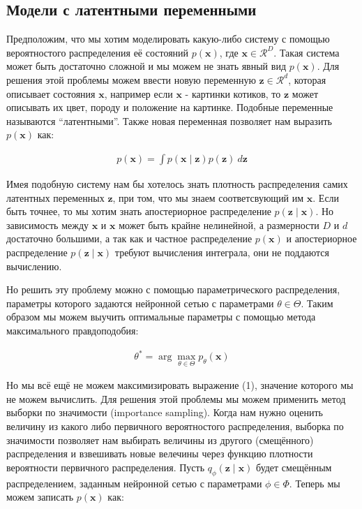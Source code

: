 \documentclass{article}
\begin{document}
\subsection{Модели с латентными переменными}

Предположим, что мы хотим моделировать какую-либо систему с помощью вероятностого распределения её состояний $p(\mathbf{x})$, где
$\mathbf{x} \in \mathcal{R}^D$. Такая система может быть достаточно сложной и мы можем не знать явный вид $p(\mathbf{x})$. Для решения этой проблемы
можем ввести новую переменную $\mathbf{z} \in \mathcal{R}^d$, которая описывает состояния $\mathbf{x}$, например если $\mathbf{x}$ - картинки котиков, то
$\mathbf{z}$ может описывать их цвет, породу и положение на картинке. Подобные переменные называются ``латентными''.
Также новая переменная позволяет нам выразить $p(\mathbf{x})$ как:

\begin{align*}
    p(\mathbf{x}) = \int p(\mathbf{x} \mid \mathbf{z}) p(\mathbf{z}) ~d\mathbf{z}
    \tag{1}
\end{align*}

Имея подобную систему нам бы хотелось знать плотность распределения самих латентных переменных $\mathbf{z}$, при том, что мы знаем соответсвующий
им $\mathbf{x}$. Если быть точнее, то мы хотим знать апостериорное распределение $p(\mathbf{z} \mid \mathbf{x})$. Но зависимость между $\mathbf{x}$ и
$\mathbf{x}$ может быть крайне нелинейной, а размерности $D$ и $d$ достаточно большими, а так как и частное распределение $p(\mathbf{x})$ и апостериорное
распределение $p(\mathbf{z} \mid \mathbf{x})$ требуют вычисления интеграла, они не поддаются вычислению.

Но решить эту проблему можно с помощью параметрического распределения, параметры которого задаются нейронной сетью с параметрами $\theta \in \Theta$.
Таким образом мы можем выучить оптимальные параметры с помощью метода максимального правдоподобия:

\begin{align*}
   \theta^* = \arg \max_{\theta \in \Theta} p_\theta(\mathbf{x}) 
   \tag{2}
\end{align*}

Но мы всё ещё не можем максимизировать выражение (1), значение которого мы не можем вычислить. Для решения этой проблемы мы можем применить метод
выборки по значимости (importance sampling). Когда нам нужно оценить величину из какого либо первичного вероятностого распределения, выборка по
значимости позволяет нам выбирать величины из другого (смещённого) распределения и взвешивать новые велечины через функцию плотности вероятности 
первичного распределения. Пусть $q_\phi(\mathbf{z} \mid \mathbf{x})$ будет смещённым распределением, заданным нейронной сетью с параметрами $\phi \in \Phi$.
Теперь мы можем записать $p(\mathbf{x})$ как:
\end{document}
